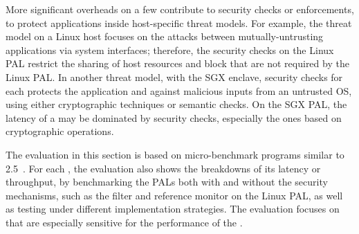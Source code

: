More significant overheads
on a few \hostapis{} contribute to security checks or enforcements,
to protect applications
inside host-specific threat models.
For example, the threat model on a Linux host
focuses on the attacks between mutually-untrusting applications via system interfaces;
therefore,
the security checks on the Linux PAL
restrict the sharing of host resources and block \linuxapis{} that are not required by the Linux PAL.
In another threat model, with the SGX enclave, 
security checks for each \hostapi{}
protects the application and \libos{} against malicious inputs from an untrusted OS,
using either cryptographic techniques or semantic checks.
On the SGX PAL, the latency of a \hostapi{} may be dominated
by security checks,
especially the ones based on cryptographic operations.


The evaluation in this section is based on micro-benchmark programs similar to \lmbench{} 2.5~\cite{McVoy:lmbench}.
For each \hostapis{}, the evaluation also shows the breakdowns
of its latency or throughput,
by benchmarking the PALs both with and without the security mechanisms, such as the \seccomp{} filter and reference monitor on the Linux PAL,
as well as testing under different
implementation strategies.
The evaluation focuses on \hostapis{} that are especially sensitive for the performance of the \graphene{} \libos{}.




















